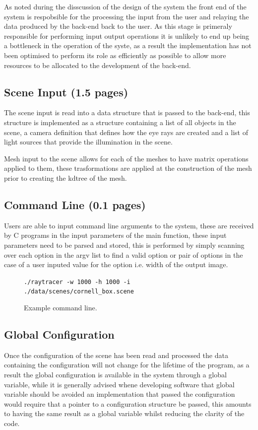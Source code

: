 As noted during the disscussion of the design of the system the front end of the system is respobsible for the processing
the input from the user and relaying the data produced by the back-end back to the user. As this stage is primeraly responsible
for performing input output operations it is unlikely to end up being a bottleneck in the operation of the syste, as a
result the implementation has not been optimised to perform its role as efficiently as possible to allow more resources
to be allocated to the development of the back-end.

\subsection{Scene Input (1.5 pages)}
The scene input is read into a data structure that is passed to the back-end, this structure is implemented as a structure
containing a list of all objects in the scene, a camera definition that defines how the eye rays are created and a list
of light sources that provide the illumination in the scene.

Mesh input to the scene allows for each of the meshes to have matrix operations applied to them, these trasformations
are applied at the construction of the mesh prior to creating the kdtree of the mesh.

\subsection{Command Line (0.1 pages)}
Users are able to input command line arguments to the system, these are received by C programs in the input parameters of
the main function, these input parameters need to be parsed and stored, this is performed by simply scanning over each
option in the argv list to find a valid option or pair of options in the case of a user inputed value for the option
i.e. width of the output image.

\begin{figure}[h]
\texttt{./raytracer -w 1000 -h 1000 -i ./data/scenes/cornell\_box.scene}
\caption{Example command line.}
\end{figure}

\subsection{Global Configuration}
Once the configuration of the scene has been read and processed the data containing the configuration will not change for
the lifetime of the program, as a result the global configuration is available in the system through a global variable, while
it is generally advised whene developing software that global variable should be avoided an implementation that passed the
configuration would require that a pointer to a configuration structure be passed, this amounts to having the same result
as a global variable whilst reducing the clarity of the code.

